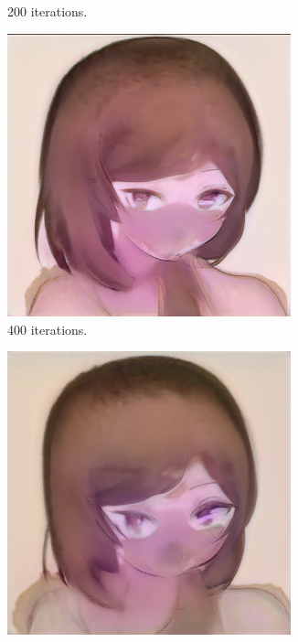 \documentclass[conference]{IEEEtran}
\theoremstyle{definition}
\theoremstyle{remark}
\theoremstyle{remark}
\begin{document}
\begin{figure}
\begin{subfigure}[b]{0.15\textwidth}
    \caption{200 iterations.}
  \end{subfigure}
  \begin{subfigure}[b]{0.15\textwidth}
    \centering \includegraphics[width=0.9\textwidth]{figs/anime-js-2.png}
    \caption{400 iterations.}
  \end{subfigure}
  \begin{subfigure}[b]{0.15\textwidth}
    \centering \includegraphics[width=0.9\textwidth]{figs/anime-js-3.png}

\end{subfigure}
\end{figure}
\end{document}
